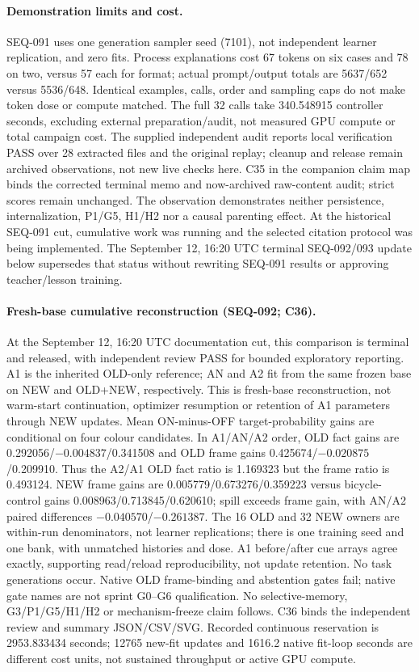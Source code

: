 \documentclass{article}
\begin{document}
\paragraph{Demonstration limits and cost.} SEQ-091 uses one generation sampler seed (7101), not independent learner replication, and zero fits. Process explanations cost 67 tokens on six cases and 78 on two, versus 57 each for format; actual prompt/output totals are 5637/652 versus 5536/648. Identical examples, calls, order and sampling caps do not make token dose or compute matched. The full 32 calls take 340.548915 controller seconds, excluding external preparation/audit, not measured GPU compute or total campaign cost. The supplied independent audit reports local verification PASS over 28 extracted files and the original replay; cleanup and release remain archived observations, not new live checks here. C35 in the companion claim map binds the corrected terminal memo and now-archived raw-content audit; strict scores remain unchanged. The observation demonstrates neither persistence, internalization, P1/G5, H1/H2 nor a causal parenting effect. At the historical SEQ-091 cut, cumulative work was running and the selected citation protocol was being implemented. The September 12, 16:20 UTC terminal SEQ-092/093 update below supersedes that status without rewriting SEQ-091 results or approving teacher/lesson training.

\paragraph{Fresh-base cumulative reconstruction (SEQ-092; C36).} At the September 12, 16:20 UTC documentation cut, this comparison is terminal and released, with independent review PASS for bounded exploratory reporting. A1 is the inherited OLD-only reference; AN and A2 fit from the same frozen base on NEW and OLD+NEW, respectively. This is fresh-base reconstruction, not warm-start continuation, optimizer resumption or retention of A1 parameters through NEW updates. Mean ON-minus-OFF target-probability gains are conditional on four colour candidates. In A1/AN/A2 order, OLD fact gains are 0.292056/$-0.004837$/0.341508 and OLD frame gains 0.425674/$-0.020875$/0.209910. Thus the A2/A1 OLD fact ratio is 1.169323 but the frame ratio is 0.493124. NEW frame gains are 0.005779/0.673276/0.359223 versus bicycle-control gains 0.008963/0.713845/0.620610; spill exceeds frame gain, with AN/A2 paired differences $-0.040570$/$-0.261387$. The 16 OLD and 32 NEW owners are within-run denominators, not learner replications; there is one training seed and one bank, with unmatched histories and dose. A1 before/after cue arrays agree exactly, supporting read/reload reproducibility, not update retention. No task generations occur. Native OLD frame-binding and abstention gates fail; native gate names are not sprint G0--G6 qualification. No selective-memory, G3/P1/G5/H1/H2 or mechanism-freeze claim follows. C36 binds the independent review and summary JSON/CSV/SVG. Recorded continuous reservation is 2953.833434 seconds; 12765 new-fit updates and 1616.2 native fit-loop seconds are different cost units, not sustained throughput or active GPU compute.
\end{document}
